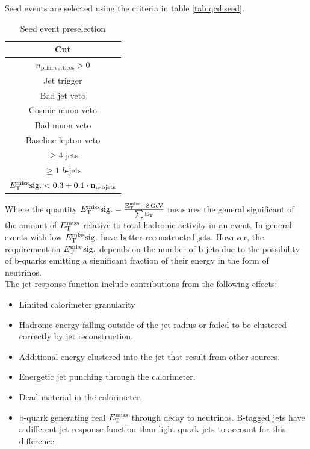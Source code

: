 \indent Seed events are selected using the criteria in table \ref{tab:qcd:seed}. \\

 \begin{table}[htp]
 \caption{Seed event preselection}
 \begin{center}
 \begin{tabular}{c} \hline
   Cut\\ \hline
   $n_\mathrm{prim. vertices} > 0$\\
   Jet trigger\\
   Bad jet veto\\
   Cosmic muon veto\\
   Bad muon veto\\
   Baseline lepton veto\\
   $\geq 4$ jets\\
   $\geq 1$ $b$-jets\\
   $E_{\mathrm{T}}^{\mathrm{miss}}\rm{sig.} < 0.3 + 0.1\cdot n_{\textup{n-bjets}}$ \\ \hline
 \end{tabular}
 \end{center}
 \label{tb:seed_events_presel}
 \end{table}

\indent Where the quantity $E_{\mathrm{T}}^{\mathrm{miss}}\rm{sig.}=\frac{ E_{\mathrm{T}}^{\mathrm{miss}}-8\rm{\,GeV} } {\sum E_\mathrm{T} }$ measures the general significant of the amount of $E_{\mathrm{T}}^{\mathrm{miss}}$ relative to total hadronic activity in an event.  In general events with low $E_{\mathrm{T}}^{\mathrm{miss}}\rm{sig.}$ have better reconstructed jets.  However, the requirement on $E_{\mathrm{T}}^{\mathrm{miss}}\rm{sig.}$ depends on the number of b-jets due to the possibility of b-quarks emitting a significant fraction of their energy in the form of neutrinos.  \\

\indent The jet response function include contributions from the following effects: \\

\begin{itemize}
\item Limited calorimeter granularity
\item Hadronic energy falling outside of the jet radius or failed to be clustered correctly by jet reconstruction.
\item Additional energy clustered into the jet that result from other sources.
\item Energetic jet punching through the calorimeter.
\item Dead material in the calorimeter.
\item b-quark generating real $E_{\mathrm{T}}^{\mathrm{miss}}$ through decay to neutrinos.  B-tagged jets have a different jet response function than light quark jets to account for this difference.
\end{itemize}

